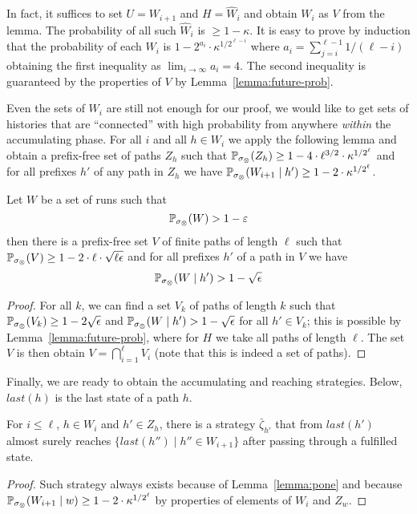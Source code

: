 \documentclass[a4paper,UKenglish]{lipics}
\renewcommand{\Pr}[3][]{\ifblank{#1}{\mathbb{P}_{#2}}{\mathbb{P}^{#1}_{#2}}(#3)}
\newcommand{\last}[1]{\mathit{last}(#1)}
\begin{document}
\noindent
In fact, it suffices to set $U = W_{i+1}$ and $H = \hat{W}_i$ and obtain $W_i$ as $V$ from the lemma. The probability of all such $\hat{W}_i$ is $\geq 1-\kappa$. It is easy to prove by induction that the probability of each $W_i$ is $1-2^{a_i} \cdot \kappa^{1/2^{\ell - i}}$ where $a_i = \sum_{j=i}^{\ell-1} 1/(\ell-i)$ obtaining the first inequality as $\lim_{i\to\infty} a_i = 4$. The second inequality is guaranteed by the properties of $V$ by Lemma~\ref{lemma:future-prob}.

Even the sets of $W_i$ are still not enough for our proof, we would like to get sets of histories that are ``connected'' with high probability from anywhere \emph{within} the accumulating phase.
For all $i$ and all $h\in W_i$ we apply the following lemma and obtain a prefix-free set of paths $Z_h$ such that
$\Pr{\sigma_\otimes}{Z_h} \ge 1 - 4 \cdot \ell^{3/2} \cdot \kappa^{1/2^\ell}$ and for all prefixes $h'$ of any path in $Z_h$ we have $\Pr{\sigma_\otimes}{W_{i+1}\mid h'} \ge 1 - 2 \cdot \kappa^{1/2^\ell}$.

\begin{lemma}\label{lemma:still-in-set}
	Let $W$ be a set of runs such that
	\[
	\Pr{\sigma_\otimes}{W} > 1-\varepsilon
	\]
	then there is a prefix-free set $V$ of finite paths of length
	$\ell$ such that $\Pr{\sigma_\otimes}{V } \ge 1- 2\cdot\ell\cdot\sqrt{\ell\epsilon}$
	and for all prefixes $h'$ of a path in $V$
	we have
	\[
	\Pr{\sigma_\otimes}{W \mid h'} > 1 - \sqrt{\epsilon}
	\]
\end{lemma}
\begin{proof}
	For all $k$, we can find a set
	$V_k$ of paths of length $k$ such that $\Pr{\sigma_{\otimes}}{V_k} \ge 1 - 2\sqrt{\epsilon}$ and
	$\Pr{\sigma_\otimes}{W \mid h'} > 1 - \sqrt{\epsilon}$ for all $h'\in V_k$; this is possible by
	Lemma~\ref{lemma:future-prob}, where for $H$ we take all paths
	of length $\ell$. The set $V$ is then
	obtain $V = \bigcap_{i=1}^\ell V_i$ (note that this is indeed a set of paths).
\end{proof}

Finally, we are ready to obtain the accumulating and reaching strategies. Below, $\last{h}$ is the last state of a path $h$.

\begin{lemma}
	For $i\le \ell$, $h\in W_i$ and $h'\in Z_h$, there is a strategy $\bar\zeta_{h'}$
	that from $\last{h'}$ almost surely reaches $\{\last{h''} \mid h''\in W_{i+1}\}$ after passing through a fulfilled state.
\end{lemma}
\begin{proof}
	Such strategy always exists because of Lemma~\ref{lemma:pone} and because
	$\Pr{\sigma_\otimes}{W_{i+1}\mid w} \ge 1 - 2 \cdot \kappa^{1/2^\ell}$ by properties of elements of $W_i$ and $Z_w$.
\end{proof}
\end{document}
